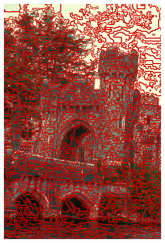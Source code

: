 \begin{figure}
{		\includegraphics[scale=\scalefivebsdtest]{pictures/bsd-test-5-fh}
	}
	\subfigure{
}
\end{figure}
